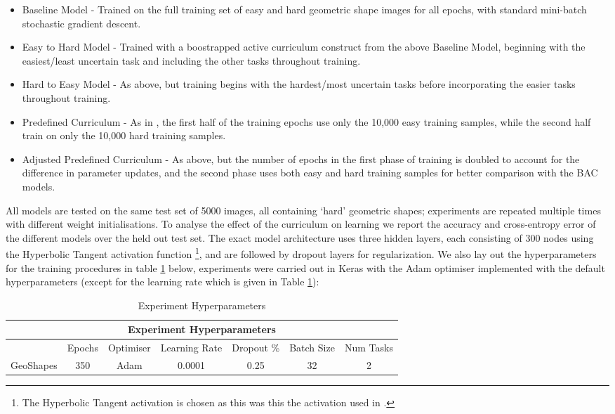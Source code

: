  \begin{itemize}
 \item Baseline Model - Trained on the full training set of easy and hard geometric shape images for all epochs, with standard mini-batch stochastic gradient descent.
 \item Easy to Hard Model - Trained with a boostrapped active curriculum construct from the above Baseline Model, beginning with the easiest/least uncertain task and including the other tasks throughout training.
 \item Hard to Easy Model - As above, but training begins with the hardest/most uncertain tasks before incorporating the easier tasks throughout training.
 \item Predefined Curriculum - As in \cite{Bengio2009}, the first half of the training epochs use only the 10,000 easy training samples, while the second half train on only the 10,000 hard training samples.
 \item Adjusted Predefined Curriculum - As above, but the number of epochs in the first phase of training is doubled to account for the difference in parameter updates, and the second phase uses both easy and hard training samples for better comparison with the BAC models.
 \end{itemize}
 
All models are tested on the same test set of 5000 images, all containing `hard' geometric shapes; experiments are repeated multiple times with different weight initialisations. To analyse the effect of the curriculum on learning we report the accuracy and cross-entropy error of the different models over the held out test set. The exact model architecture uses three hidden layers, each consisting of 300 nodes using the Hyperbolic Tangent activation function \cite{karlik2011performance} \footnote{The Hyperbolic Tangent activation is chosen as this was this the activation used in \cite{Bengio2009}.}, and are followed by dropout layers for regularization. We also lay out the hyperparameters for the training procedures in table \ref{tab:HyperParams} below, experiments were carried out in Keras \cite{chollet2015keras} with the Adam optimiser implemented with the default hyperparameters (except for the learning rate which is given in Table \ref{tab:HyperParams}):

\begin{table}[h]
\caption{Experiment Hyperparameters} \label{tab:HyperParams}
\begin{tabular}{|c||c|c|c|c|c|c|}
\hline
\multicolumn{7}{|c|}{Experiment Hyperparameters} \\
\hline
 &Epochs & Optimiser &Learning Rate & Dropout \% & Batch Size & Num Tasks \\
\hline
GeoShapes & 350 & Adam & 0.0001 & 0.25 & 32 & 2  \\
\hline
\end{tabular}
\end{table}


